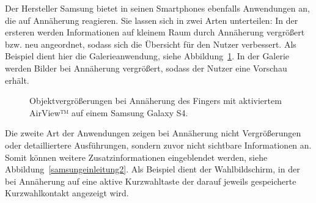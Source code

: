\documentclass[12pt,numbers=noenddot,parskip,bibliography=totocnumbered,listof=totocnumbered]{scrreprt}
\begin{document}
Der Hersteller Samsung bietet in seinen Smartphones ebenfalls Anwendungen an, die auf Annäherung reagieren. Sie lassen sich in zwei Arten unterteilen: In der ersteren werden Informationen auf kleinem Raum durch Annäherung vergrößert bzw. neu angeordnet, sodass sich die Übersicht für den Nutzer verbessert. Als Beispiel dient hier die Galerieanwendung, siehe Abbildung~\ref{samsungeinleitung1}. In der Galerie werden Bilder bei Annäherung vergrößert, sodass der Nutzer eine Vorschau erhält.
\begin{figure}
\centering
{}
\hfill
{}
\caption{Objektvergrößerungen bei Annäherung des Fingers mit aktiviertem AirView™ auf einem Samsung Galaxy S4.}
\label{samsungeinleitung1}
\end{figure}
Die zweite Art der Anwendungen zeigen bei Annäherung nicht Vergrößerungen oder detailliertere Ausführungen, sondern zuvor nicht sichtbare Informationen an. Somit können weitere Zusatzinformationen eingeblendet werden, siehe Abbildung~\ref{samsungeinleitung2}. Als Beispiel dient der Wahlbildschirm, in der bei Annäherung auf eine aktive Kurzwahltaste der darauf jeweils gespeicherte Kurzwahlkontakt angezeigt wird.
\end{document}
